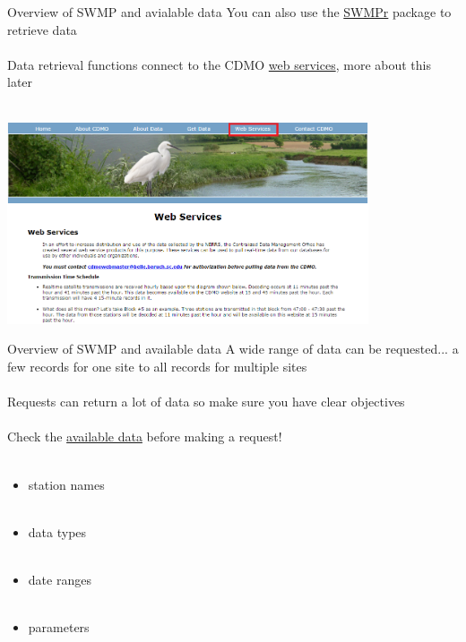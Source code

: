 \documentclass[xcolor=svgnames]{beamer}\usepackage[]{graphicx}\usepackage[]{color}
\begin{document}
\begin{frame}{Overview of SWMP and avialable data}
You can also use the \href{https://github.com/fawda123/SWMPr}{SWMPr} package to retrieve data \\~\\
Data retrieval functions connect to the CDMO \href{http://cdmo.baruch.sc.edu/webservices.cfm}{web services}, more about this later \\~\\
\centerline{\includegraphics[width = 0.8\textwidth]{web_serv.png}}
\end{frame}

\begin{frame}{Overview of SWMP and available data}
A wide range of data can be requested... a few records for one site to all records for multiple sites \\~\\
Requests can return a lot of data so make sure you have clear objectives \\~\\
Check the \href{http://cdmo.baruch.sc.edu/data/availableOne.cfm}{available data} before making a request! \\~\\
\begin{itemize}
\item station names \\~\\
\item data types \\~\\
\item date ranges \\~\\
\item parameters \\~\\
\end{itemize}
\end{frame}
\end{document}

